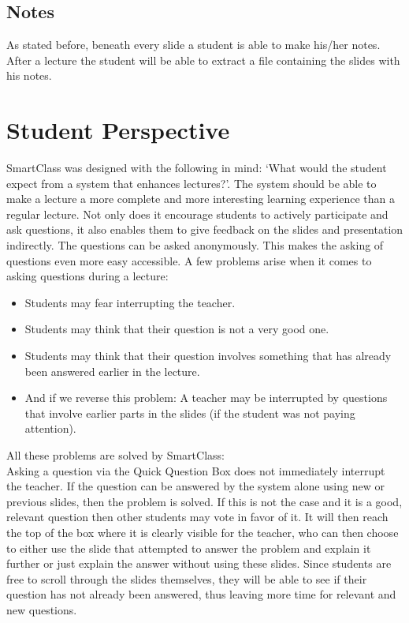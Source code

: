 \documentclass[11pt]{article}
\begin{document}
\subsection{Notes}
As stated before, beneath every slide a student is able to make his/her notes. After a lecture the student will be able to extract a file containing the slides with his notes. 

\section{Student Perspective}
SmartClass was designed with the following in mind: `What would the student expect from a system that enhances lectures?’. The system should be able to make a lecture a more complete and more interesting learning experience than a regular lecture. Not only does it encourage students to actively participate and ask questions, it also enables them to give feedback on the slides and presentation indirectly. 
The questions can be asked anonymously. This makes the asking of questions even more easy accessible. A few problems arise when it comes to asking questions during a lecture:
\begin{itemize}
\item Students may fear interrupting the teacher.
\item Students may think that their question is not a very good one.
\item Students may think that their question involves something that has already been answered earlier in the lecture.
\item And if we reverse this problem: A teacher may be interrupted by questions that involve earlier parts in the slides (if the student was not paying attention).
\end{itemize}
All these problems are solved by SmartClass:\\
Asking a question via the Quick Question Box does not immediately interrupt the teacher. If the question can be answered by the system alone using new or previous slides, then the problem is solved. If this is not the case and it is a good, relevant question then other students may vote in favor of it. It will then reach the top of the box where it is clearly visible for the teacher, who can then choose to either use the slide that attempted to answer the problem and explain it further or just explain the answer without using these slides. Since students are free to scroll through the slides themselves, they will be able to see if their question has not already been answered, thus leaving more time for relevant and new questions.
\end{document}
